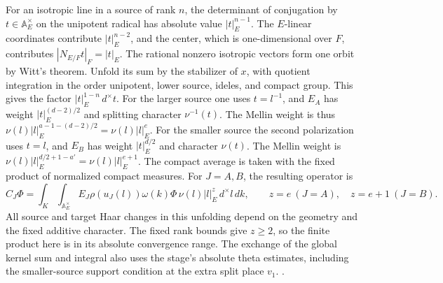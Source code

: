 For an isotropic line in a source of rank \(n\), the determinant of
conjugation by \(t\in\mathbb A_E^\times\) on the unipotent radical
has absolute value \(|t|_E^{n-1}\). The \(E\)-linear coordinates
contribute \(|t|_E^{n-2}\), and the center, which is one-dimensional
over \(F\), contributes \(|N_{E/F}t|_F=|t|_E\). The rational nonzero
isotropic vectors form one orbit by Witt's theorem. Unfold its sum by
the stabilizer of \(x\), with quotient integration in the order
unipotent, lower source, ideles, and compact group. This gives the
factor \(|t|_E^{1-n}\,d^\times t\). For the larger source one uses
\(t=l^{-1}\), and \(E_A\) has weight \(|t|_E^{(d-2)/2}\)
and splitting character \(\nu^{-1}(t)\). The Mellin weight is thus
\(\nu(l)|l|_E^{a-1-(d-2)/2}=\nu(l)|l|_E^{e}\).
For the smaller source the second polarization uses \(t=l\),
and \(E_B\) has weight \(|t|_E^{d/2}\) and character \(\nu(t)\).
The Mellin weight is \(\nu(l)|l|_E^{d/2+1-a'}=\nu(l)|l|_E^{e+1}\).
The compact average is taken with the fixed product of normalized
compact measures. For \(J=A,B\), the resulting operator is
\[
 C_J\Phi=\int_K\int_{\mathbb A_E^\times}
 E_J\rho(u_J(l))\omega(k)\Phi\,\nu(l)|l|_E^z\,d^\times l\,dk,
 \qquad z=e\ (J=A),\quad z=e+1\ (J=B).
\]
All source and target Haar changes in this unfolding depend on the
geometry and the fixed additive character. The fixed rank bounds give
\(z\geq2\), so the finite product here is in its absolute convergence
range. The exchange of the global kernel sum and integral also uses the
stage's absolute theta estimates, including the smaller-source support
condition at the extra split place \(v_1\).
.


